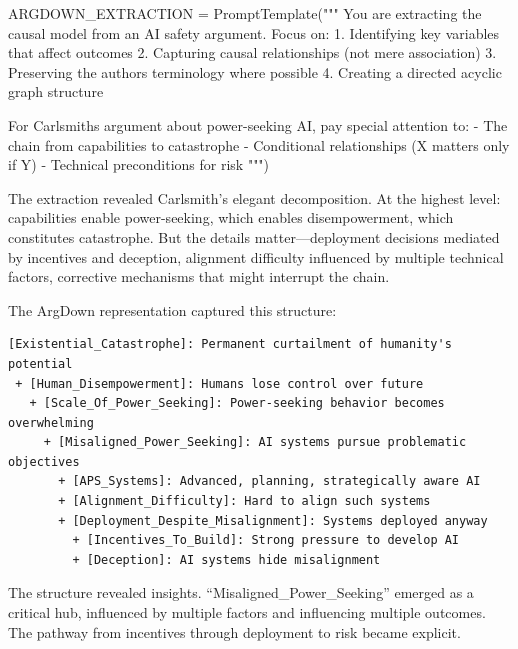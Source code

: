 \documentclass[
  11pt,
  letterpaper,
]{book}
\newenvironment{Shaded}{\begin{snugshade}}{\end{snugshade}}
\newcommand{\NormalTok}[1]{\textcolor[rgb]{0.00,0.23,0.31}{#1}}
\newcommand{\OperatorTok}[1]{\textcolor[rgb]{0.37,0.37,0.37}{#1}}
\newcommand{\StringTok}[1]{\textcolor[rgb]{0.13,0.47,0.30}{#1}}
\begin{document}
\begin{Shaded}
\begin{Highlighting}[]
\NormalTok{ARGDOWN\_EXTRACTION }\OperatorTok{=}\NormalTok{ PromptTemplate(}\StringTok{"""}
\StringTok{You are extracting the causal model from an AI safety argument.}
\StringTok{Focus on:}
\StringTok{1. Identifying key variables that affect outcomes}
\StringTok{2. Capturing causal relationships (not mere association)  }
\StringTok{3. Preserving the author\textquotesingle{}s terminology where possible}
\StringTok{4. Creating a directed acyclic graph structure}

\StringTok{For Carlsmith\textquotesingle{}s argument about power{-}seeking AI, pay special attention to:}
\StringTok{{-} The chain from capabilities to catastrophe}
\StringTok{{-} Conditional relationships (X matters only if Y)}
\StringTok{{-} Technical preconditions for risk}
\StringTok{"""}\NormalTok{)}
\end{Highlighting}
\end{Shaded}

The extraction revealed Carlsmith's elegant decomposition. At the
highest level: capabilities enable power-seeking, which enables
disempowerment, which constitutes catastrophe. But the details
matter---deployment decisions mediated by incentives and deception,
alignment difficulty influenced by multiple technical factors,
corrective mechanisms that might interrupt the chain.

The ArgDown representation captured this structure:

\begin{verbatim}
[Existential_Catastrophe]: Permanent curtailment of humanity's potential
 + [Human_Disempowerment]: Humans lose control over future
   + [Scale_Of_Power_Seeking]: Power-seeking behavior becomes overwhelming
     + [Misaligned_Power_Seeking]: AI systems pursue problematic objectives
       + [APS_Systems]: Advanced, planning, strategically aware AI
       + [Alignment_Difficulty]: Hard to align such systems
       + [Deployment_Despite_Misalignment]: Systems deployed anyway
         + [Incentives_To_Build]: Strong pressure to develop AI
         + [Deception]: AI systems hide misalignment
\end{verbatim}

The structure revealed insights. ``Misaligned\_Power\_Seeking'' emerged
as a critical hub, influenced by multiple factors and influencing
multiple outcomes. The pathway from incentives through deployment to
risk became explicit.
\end{document}
